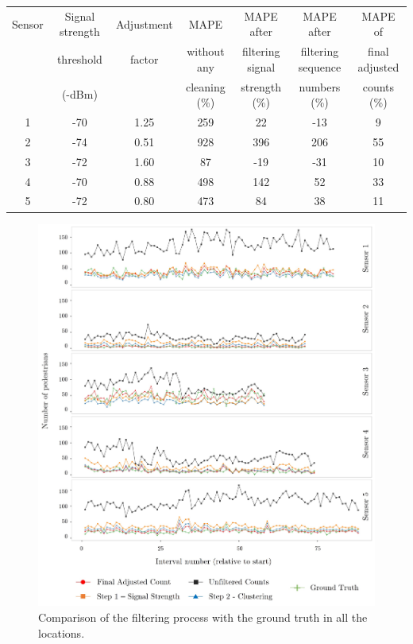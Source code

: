 \begin{table}
	{\begin{tabular}{ccccccc} 
		\toprule
			Sensor & Signal strength & Adjustment & MAPE & MAPE after & MAPE after & MAPE of\\
			& threshold & factor & without any & filtering signal & filtering sequence & final adjusted\\
			& (-dBm) & &  cleaning (\%) & strength (\%) & numbers (\%) & counts (\%)\\
		 \midrule
			1 & -70 & 1.25 & 259 &  22 & -13 &  9 \\
			2 & -74 & 0.51 & 928 & 396 & 206 & 55 \\
			3 & -72 & 1.60 &  87 & -19 & -31 & 10 \\
			4 & -70 & 0.88 & 498 & 142 &  52 & 33 \\
			5 & -72 & 0.80 & 473 &  84 &  38 & 11 \\
		 \bottomrule
	\end{tabular}}
	\label{errors_table}
\end{table}

\begin{figure}
	\begin{center}
		\includegraphics [width=\linewidth,trim=6 6 6 6,clip] {images/main_comparison.jpeg}
		\caption{Comparison of the filtering process with the ground truth in all the locations.}
		\label{main_comparison}
	\end{center}
\end{figure}

